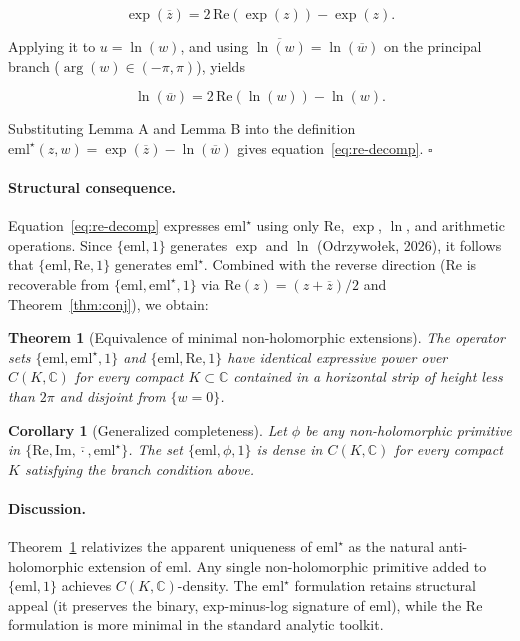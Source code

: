 \documentclass[12pt,a4paper]{article}
\newtheorem{theorem}{Theorem}
\newtheorem{corollary}{Corollary}
\newcommand{\emlstar}{\mathrm{eml}^{\star}}
\newcommand{\eml}{\mathrm{eml}}
\newcommand{\conj}[1]{\overline{#1}}
\begin{document}
\begin{equation}
\exp(\conj{z}) = 2\,\mathrm{Re}(\exp(z)) - \exp(z).
\tag{Lemma A}
\label{eq:lemma-A}
\end{equation}

Applying it to $u = \ln(w)$, and using
$\conj{\ln(w)} = \ln(\conj{w})$ on the principal branch
($\arg(w) \in (-\pi, \pi)$), yields

\begin{equation}
\ln(\conj{w}) = 2\,\mathrm{Re}(\ln(w)) - \ln(w).
\tag{Lemma B}
\label{eq:lemma-B}
\end{equation}

Substituting Lemma A and Lemma B into the definition
$\emlstar(z, w) = \exp(\conj{z}) - \ln(\conj{w})$
gives equation~\eqref{eq:re-decomp}. $\square$

\paragraph{Structural consequence.}
Equation~\eqref{eq:re-decomp} expresses $\emlstar$ using only
$\mathrm{Re}$, $\exp$, $\ln$, and arithmetic operations.
Since $\{\eml, 1\}$ generates $\exp$ and $\ln$
(Odrzywołek, 2026), it follows that
$\{\eml, \mathrm{Re}, 1\}$ generates $\emlstar$.
Combined with the reverse direction
($\mathrm{Re}$ is recoverable from $\{\eml, \emlstar, 1\}$
via $\mathrm{Re}(z) = (z + \conj{z})/2$ and Theorem~\ref{thm:conj}),
we obtain:

\begin{theorem}[Equivalence of minimal non-holomorphic extensions]
\label{thm:equivalence}
The operator sets $\{\eml, \emlstar, 1\}$ and
$\{\eml, \mathrm{Re}, 1\}$ have identical expressive power
over $C(K, \mathbb{C})$ for every compact
$K \subset \mathbb{C}$ contained in a horizontal strip
of height less than $2\pi$ and disjoint from $\{w = 0\}$.
\end{theorem}

\begin{corollary}[Generalized completeness]
\label{cor:generalized}
Let $\phi$ be any non-holomorphic primitive in
$\{\mathrm{Re}, \mathrm{Im}, \conj{\cdot}, \emlstar\}$.
The set $\{\eml, \phi, 1\}$ is dense in $C(K, \mathbb{C})$
for every compact $K$ satisfying the branch condition above.
\end{corollary}

\paragraph{Discussion.}
Theorem~\ref{thm:equivalence} relativizes the apparent uniqueness
of $\emlstar$ as the natural anti-holomorphic extension of $\eml$.
Any single non-holomorphic primitive added to $\{\eml, 1\}$
achieves $C(K, \mathbb{C})$-density.
The $\emlstar$ formulation retains structural appeal
(it preserves the binary, exp-minus-log signature of $\eml$),
while the $\mathrm{Re}$ formulation is more minimal in the
standard analytic toolkit.
\end{document}
